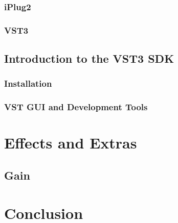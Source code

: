 \documentclass[12pt]{article}
\begin{document}
\subsubsection{iPlug2}
\subsubsection{VST3}

\subsection{Introduction to the VST3 SDK}

\subsubsection{Installation}

\subsubsection{VST GUI and Development Tools}

\section{Effects and Extras}

\subsection{Gain}

\section{Conclusion}




\end{document}
